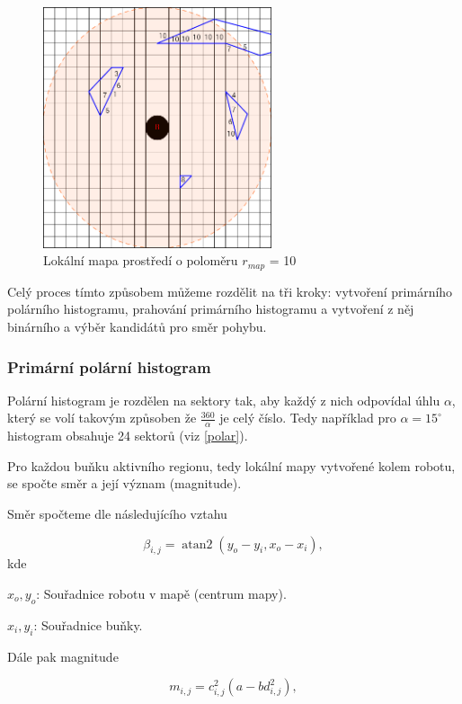 \documentclass[twoside]{ctuthesis}
\theoremstyle{plain}
\theoremstyle{definition}
\theoremstyle{note}
\DeclareMathOperator{\atantwo}{atan2}
\begin{document}
\begin{figure}
	\caption{Lokální mapa prostředí o poloměru $r_{map}$ = 10}
	
	\label{mrizka}
	\includegraphics[width=0.6\textwidth, height = 0.6\textwidth]{images/3/mrizka.png}
\end{figure}

Celý proces tímto způsobem můžeme rozdělit na tři kroky: vytvoření primárního polárního histogramu, prahování primárního histogramu a vytvoření z něj binárního a výběr kandidátů pro směr pohybu.

\subsubsection{Primární polární histogram}

Polární histogram je rozdělen na sektory tak, aby každý z nich odpovídal úhlu $\alpha$, který se volí takovým způsoben že $\frac{360}{\alpha}$ je celý číslo. Tedy například pro $\alpha = 15^{\circ}$ histogram obsahuje 24 sektorů (viz \ref{polar}).

Pro každou buňku aktivního regionu, tedy lokální mapy vytvořené kolem robotu, se spočte směr a její význam (magnitude). 

Směr spočteme dle následujícího vztahu

\begin{equation}
\beta_{i,j} = 	\atantwo ( y_o - y_i, x_o - x_i),
\end{equation}
kde

$x_o, y_o$: Souřadnice robotu v mapě (centrum mapy).

$x_i, y_i$: Souřadnice buňky.	

Dále pak magnitude

\begin{equation}
m_{i,j} = c_{i,j}^2(a - bd_{i,j}^2),
\end{equation}
\end{document}
